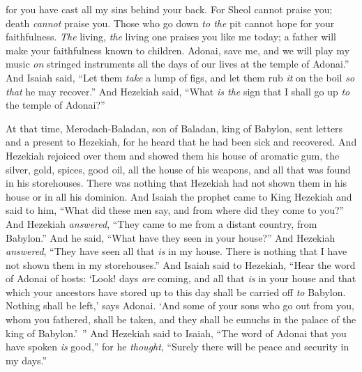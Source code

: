 \begin{biblechapter}
for you have cast all my sins behind your back.
\verse For Sheol cannot praise you; death \textit{cannot} praise you. 
Those who go down \textit{to the} pit cannot hope for your faithfulness.
\verse \textit{The} living, \textit{the} living one praises you like me today; 
a father will make your faithfulness known to children.
\verse Adonai, save me, and we will play my music \textit{on} stringed instruments all the days of our lives at the temple of Adonai.”
\verse And Isaiah said, “Let them \textit{take} a lump of figs, and let them rub \textit{it} on the boil \textit{so that} he may recover.”
\verse And Hezekiah said, “What \textit{is the} sign that I shall go up \textit{to} the temple of Adonai?”
\end{biblechapter}

\begin{biblechapter} %
 At that time, Merodach-Baladan, son of Baladan, king of Babylon, sent letters and a present to Hezekiah, for he heard that he had been sick and recovered.
\verse And Hezekiah rejoiced over them and showed them his house of aromatic gum, the silver, gold, spices, good oil, all the house of his weapons, and all that was found in his storehouses. There was nothing that Hezekiah had not shown them in his house or in all his dominion.
\verse And Isaiah the prophet came to King Hezekiah and said to him, “What did these men say, and from where did they come to you?” And Hezekiah \textit{answered}, “They came to me from a distant country, from Babylon.”
\verse And he said, “What have they seen in your house?” And Hezekiah \textit{answered}, “They have seen all that \textit{is} in my house. There is nothing that I have not shown them in my storehouses.”
\verse And Isaiah said to Hezekiah, “Hear the word of Adonai of hosts:
\verse ‘Look! days \textit{are} coming, and all that \textit{is} in your house and that which your ancestors have stored up to this day shall be carried off \textit{to} Babylon. Nothing shall be left,’ says Adonai.
\verse ‘And some of your sons who go out from you, whom you fathered, shall be taken, and they shall be eunuchs in the palace of the king of Babylon.’ ”
\verse And Hezekiah said to Isaiah, “The word of Adonai that you have spoken \textit{is} good,” for he \textit{thought}, “Surely there will be peace and security in my days.”
\end{biblechapter}

